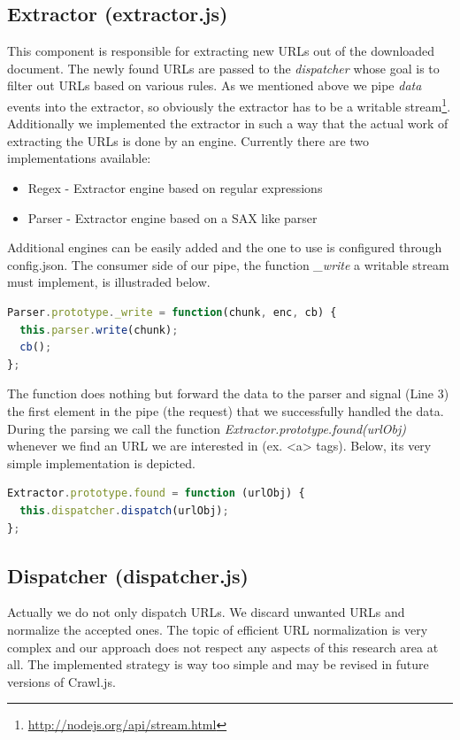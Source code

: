 \subsection{Extractor (extractor.js)}
This component is responsible for extracting new URLs out of the downloaded document. The newly found URLs are passed to the \emph{dispatcher} whose goal is to filter out URLs based on various rules. As we mentioned above we pipe \emph{data} events into the extractor, so obviously the extractor has to be a writable stream\footnote{\url{http://nodejs.org/api/stream.html}}. Additionally we implemented the extractor in such a way that the actual work of extracting the URLs is done by an engine. Currently there are two implementations available:
\begin{itemize}
  \item Regex - Extractor engine based on regular expressions
  \item Parser - Extractor engine based on a SAX like parser
\end{itemize}
Additional engines can be easily added and the one to use is configured through config.json. The consumer side of our pipe, the function \emph{\_write} a writable stream must implement, is illustraded below.

\begin{lstlisting}[language=JavaScript]
Parser.prototype._write = function(chunk, enc, cb) {
  this.parser.write(chunk);
  cb();
};
\end{lstlisting}

The function does nothing but forward the data to the parser and signal (Line 3) the first element in the pipe (the request) that we successfully handled the data. During the parsing we call the function \emph{Extractor.prototype.found(urlObj)} whenever we find an URL we are interested in (ex. <a> tags). Below, its very simple implementation is depicted.

\begin{lstlisting}[language=JavaScript]
Extractor.prototype.found = function (urlObj) {
  this.dispatcher.dispatch(urlObj);
};
\end{lstlisting}

\subsection{Dispatcher (dispatcher.js)}
Actually we do not only dispatch URLs. We discard unwanted URLs and normalize the accepted ones. The topic of efficient URL normalization\cite{wiki:url_normalization} is very complex and our approach does not respect any aspects of this research area at all. The implemented strategy is way too simple and may be revised in future versions of Crawl.js.

